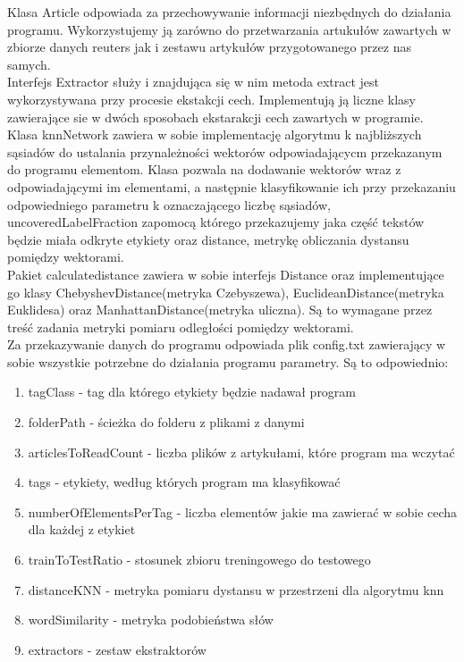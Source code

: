 \documentclass{classrep}
\begin{document}
Klasa Article odpowiada za przechowywanie informacji niezbędnych do działania programu. Wykorzystujemy ją zarówno do przetwarzania artukułów zawartych w zbiorze danych reuters jak i zestawu artykułów przygotowanego przez nas samych.\\
Interfejs Extractor służy i znajdująca się w nim metoda extract jest wykorzystywana przy procesie ekstakcji cech. Implementują ją liczne klasy zawierające sie w dwóch sposobach ekstarakcji cech zawartych w programie.\\
Klasa knnNetwork zawiera w sobie implementację algorytmu k najbliższych sąsiadów do ustalania przynależności wektorów odpowiadającycm przekazanym do programu elementom. Klasa pozwala na dodawanie wektorów wraz z odpowiadającymi im elementami, a następnie klasyfikowanie ich przy przekazaniu odpowiedniego parametru k oznaczającego liczbę sąsiadów, uncoveredLabelFraction zapomocą którego przekazujemy jaka część tekstów będzie miała odkryte etykiety oraz distance, metrykę obliczania dystansu pomiędzy wektorami.\\
Pakiet calculatedistance zawiera w sobie interfejs Distance oraz implementujące go klasy ChebyshevDistance(metryka Czebyszewa), EuclideanDistance(metryka Euklidesa) oraz ManhattanDistance(metryka uliczna). Są to wymagane przez treść zadania metryki pomiaru odległości pomiędzy wektorami.\\
Za przekazywanie danych do programu odpowiada plik config.txt zawierający w sobie wszystkie potrzebne do działania programu parametry. Są to odpowiednio:
\begin{enumerate}
	\item tagClass - tag dla którego etykiety będzie nadawał program
	\item folderPath - ścieżka do folderu z plikami z danymi
	\item articlesToReadCount - liczba plików z artykułami, które program ma wczytać
	\item tags - etykiety, według których program ma klasyfikować
	\item numberOfElementsPerTag - liczba elementów jakie ma zawierać w sobie cecha dla każdej z etykiet
	\item trainToTestRatio - stosunek zbioru treningowego do testowego
	\item distanceKNN - metryka pomiaru dystansu w przestrzeni dla algorytmu knn
	\item wordSimilarity - metryka podobieństwa słów
	\item extractors - zestaw ekstraktorów
\end{enumerate}
\end{document}
